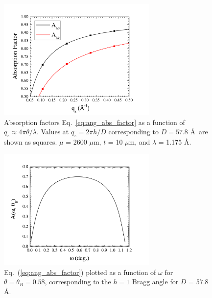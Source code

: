 \begin{figure}[htbp]
  \centering
  \includegraphics[width=0.7\textwidth]{figures/ripple/analysis/abs_factor}
  \caption[Absorption factors Eq.~\ref{eq:ang_abs_factor}
  as a function of $q_z \approx 4\pi\theta/\lambda$]
  {Absorption factors Eq.~\ref{eq:ang_abs_factor}
  as a function of $q_z \approx 4\pi\theta/\lambda$.
  Values at $q_z=2\pi h/D$ corresponding to $D=57.8$ \AA\ are shown as squares.
  $\mu$ = 2600 $\mu$m, $t$ = 10 $\mu$m, and $\lambda$ = 1.175 \AA.}
  \label{fig:abs_factor}
\end{figure}

\begin{figure}[htbp]
  \centering
  \includegraphics[width=0.7\textwidth]{figures/ripple/analysis/abs_integrand}
  \caption[Eq.~(\ref{eq:ang_abs_factor}) plotted as a function of 
  $\omega$ for $\theta=\theta_B=0.58$\textdegree, corresponding to the $h=1$ 
  Bragg angle for $D$ = 57.8 \AA]
  {Eq.~(\ref{eq:ang_abs_factor}) plotted as a function of 
  $\omega$ for $\theta=\theta_B=0.58$\textdegree, corresponding to the $h=1$ 
  Bragg angle for $D$ = 57.8 \AA.}
  \label{fig:abs_integrand}
\end{figure}

